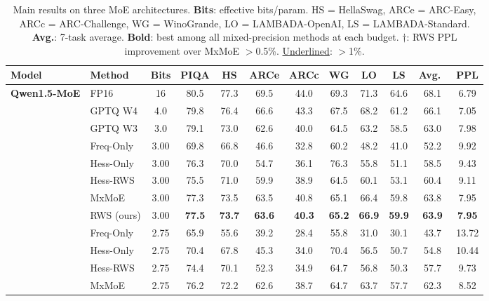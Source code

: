 \begin{table}[!t]
\centering
\small
\setlength{\tabcolsep}{3.5pt}
\caption{Main results on three MoE architectures. \textbf{Bits}: effective bits/param. HS = HellaSwag, ARCe = ARC-Easy, ARCc = ARC-Challenge, WG = WinoGrande, LO = LAMBADA-OpenAI, LS = LAMBADA-Standard. \textbf{Avg.}: 7-task average. \textbf{Bold}: best among all mixed-precision methods at each budget. $\dagger$: RWS PPL improvement over MxMoE $>$0.5\%. \underline{Underlined}: $>$1\%.}
\label{tab:main}
\begin{tabular}{llcccccccccc}
\toprule
Model & Method & Bits & PIQA & HS & ARCe & ARCc & WG & LO & LS & Avg.\ & PPL \\
\midrule
\textbf{Qwen1.5-MoE} & FP16    & 16   & 80.5 & 77.3 & 69.5 & 44.0 & 69.3 & 71.3 & 64.6 & 68.1 &  6.79 \\
                      & GPTQ W4 & 4.0  & 79.8 & 76.4 & 66.6 & 43.3 & 67.5 & 68.2 & 61.2 & 66.1 &  7.05 \\
                      & GPTQ W3 & 3.0  & 79.1 & 73.0 & 62.6 & 40.0 & 64.5 & 63.2 & 58.5 & 63.0 &  7.98 \\
\cmidrule(lr){2-12}
                      & Freq-Only   & 3.00 & 69.8 & 66.8 & 46.6 & 32.8 & 60.2 & 48.2 & 41.0 & 52.2 &   9.92 \\
                      & Hess-Only   & 3.00 & 76.3 & 70.0 & 54.7 & 36.1 & 76.3 & 55.8 & 51.1 & 58.5 &   9.43 \\
                      & Hess-RWS    & 3.00 & 75.5 & 71.0 & 59.9 & 38.9 & 64.5 & 60.1 & 53.1 & 60.4 &   9.11 \\
                      & MxMoE       & 3.00 & 77.3 & 73.5 & 63.5 & 40.8 & 65.1 & 66.4 & 59.8 & 63.8 &   7.95 \\
                      & RWS (ours)  & 3.00 & \textbf{77.5} & \textbf{73.7} & \textbf{63.6} & \textbf{40.3} & \textbf{65.2} & \textbf{66.9} & \textbf{59.9} & \textbf{63.9} &   \textbf{7.95} \\
\cmidrule(lr){2-12}
                      & Freq-Only   & 2.75 & 65.9 & 55.6 & 39.2 & 28.4 & 55.8 & 31.0 & 30.1 & 43.7 &  13.72 \\
                      & Hess-Only   & 2.75 & 70.4 & 67.8 & 45.3 & 34.0 & 70.4 & 56.5 & 50.7 & 54.8 &  10.44 \\
                      & Hess-RWS    & 2.75 & 74.4 & 70.1 & 52.3 & 34.9 & 64.7 & 56.8 & 50.3 & 57.7 &   9.73 \\
                      & MxMoE       & 2.75 & 76.2 & 72.2 & 62.6 & 38.7 & 64.7 & 63.7 & 57.7 & 62.3 &   8.52 \\

\end{tabular}
\end{table}
